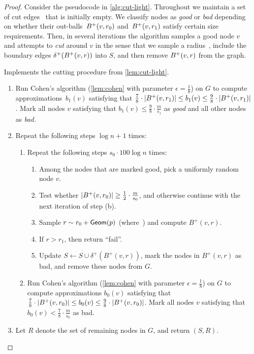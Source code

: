 \documentclass[letterpaper,11pt]{article}
\begin{document}
\begin{proof}
Consider the pseudocode in \cref{alg:cut-light}. Throughout we maintain a set of cut edges~ that is initially empty. We classify nodes as \emph{good} or \emph{bad} depending on whether their out-balls~$B^+(v, r_0)$ and~$B^+(v, r_1)$ satisfy certain size requirements. Then, in several iterations the algorithm samples a good node $v$ and attempts to \emph{cut} around $v$ in the sense that we sample a radius~, include the boundary edges $\delta^+(B^+(v, r))$ into $S$, and then remove $B^+(v, r)$ from the graph.

\begin{algorithm}[t]
\caption{Implements the cutting procedure from \cref{lem:cut-light}.} \label{alg:cut-light}
\begin{enumerate}[label=\arabic*.]
    \item Run Cohen's algorithm (\cref{lem:cohen} with parameter $\epsilon = \frac18$) on $G$ to compute approximations~$b_1(v)$ satisfying that $\tfrac78 \cdot |B^+(v, r_1)| \leq b_1(v) \leq \tfrac98 \cdot |B^+(v, r_1)|$. Mark all nodes $v$ satisfying that $b_1(v) \leq \frac98 \cdot \frac{m}{s_1}$ as \emph{good} and all other nodes as \emph{bad.}
    \item Repeat the following steps $\log n + 1$ times:
    \begin{enumerate}[label=2.\arabic*.]
        \item Repeat the following steps $s_0 \cdot 100 \log n$ times:
        \begin{enumerate}[label=2.1.\arabic*.]
            \item Among the nodes that are marked good, pick a uniformly random node $v$.
            \item Test whether $|B^+(v, r_0)| \geq \frac{1}{2} \cdot \frac{m}{s_0}$, and otherwise continue with the next iteration of step (b).
            \item Sample $r \sim r_0 + \textsf{Geom}(p)$ (where~) and compute $B^+(v, r)$.
            \item If $r > r_1$, then return ``fail''.
            \item Update $S \gets S \cup \delta^+(B^+(v, r))$, mark the nodes in $B^+(v, r)$ as bad, and remove these nodes from $G$.
        \end{enumerate}
        \item Run Cohen's algorithm (\cref{lem:cohen} with parameter $\epsilon = \frac18$) on $G$ to compute approximations $b_0(v)$ satisfying that $\tfrac78 \cdot |B^+(v, r_0)| \leq b_0(v) \leq \tfrac98 \cdot |B^+(v, r_0)|$. Mark all nodes $v$ satisfying that $b_0(v) < \frac78 \cdot \frac{m}{s_0}$ as bad.
    \end{enumerate}
    \item Let $R$ denote the set of remaining nodes in $G$, and return $(S, R)$.
\end{enumerate}
\end{algorithm}


\end{proof}
\end{document}
